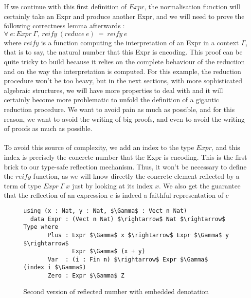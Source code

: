 If we continue with this first definition of $Expr$, the normalisation function will certainly take an Expr and produce another Expr, and we will need to prove the following correctness lemma afterwards : \\
$\forall\ e:Expr\ \Gamma,\ reify\ (reduce\ e)\ =\ reify\ e$ \\
where $reify$ is a function computing the interpretation of an Expr in a context $\Gamma$, that is to say, the natural number that this Expr is encoding.
This proof can be quite tricky to build because it relies on the complete behaviour of the reduction and on the way the interpretation is computed.
For this example, the reduction procedure won't be too heavy, but in the next sections, with more sophisticated algebraic structures, we will have more properties to deal with and it will certainly become more problematic to unfold the definition of a gigantic reduction procedure. We want to avoid pain as much as possible, and for this reason, we want to avoid the writing of big proofs, and even to avoid the writing of proofs as much as possible. \\
\\
To avoid this source of complexity, we add an index to the type $Expr$, and this index is precisely the concrete number that the Expr is encoding. This is the first brick to our type-safe reflection mechanism. Thus, it won't be necessary to define the $reify$ function, as we will know directly the concrete element reflected by a term of type $Expr\ \Gamma\ x$ just by looking at its index $x$. We also get the guarantee that the reflection of an expression $e$ is indeed a faithful representation of $e$ \\

\begin{figure}[H]
\figrule
\begin{center}
\begin{lstlisting}
using (x : Nat, y : Nat, $\Gamma$ : Vect n Nat)
  data Expr : (Vect n Nat) $\rightarrow$ Nat $\rightarrow$ Type where
       Plus : Expr $\Gamma$ x $\rightarrow$ Expr $\Gamma$ y $\rightarrow$ 
              Expr $\Gamma$ (x + y)
       Var  : (i : Fin n) $\rightarrow$ Expr $\Gamma$ (index i $\Gamma$)
       Zero : Expr $\Gamma$ Z
\end{lstlisting}
\end{center}
\caption{Second version of reflected number with embedded denotation}
\label{reflectedNaturalNumbers}
\figrule
\end{figure}

